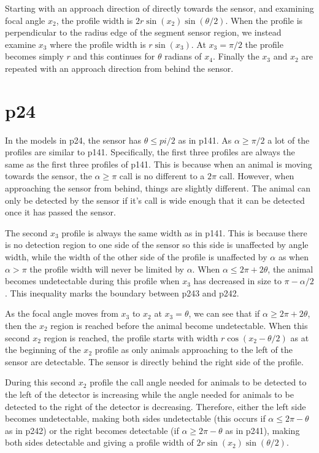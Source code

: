 Starting with an approach direction of directly towards the sensor, and examining focal angle $x_2$, the profile width is $2r\sin(x_2)\sin(\theta/2)$. When the profile is perpendicular to the radius edge of the segment sensor region, we instead examine $x_3$ where the profile width is $r\sin(x_3)$. At $x_3=\pi/2$ the profile becomes simply $r$ and this continues for $\theta $ radians of $x_4$. Finally the $x_3$ and $x_2$ are repeated with an approach direction from behind the sensor. 



\section{p24} \label{p24}

In the models in p24, the sensor has $\theta \le pi/2$ as in p141. As $\alpha \ge \pi/2$ a lot of the profiles are similar to p141. Specifically, the first three profiles are always the same as the first three profiles of p141. This is because when an animal is moving towards the sensor, the $\alpha \ge \pi$ call is no different to a $2\pi$ call. However, when approaching the sensor from behind, things are slightly different. The animal can only be detected by the sensor if it's call is wide enough that it can be detected once it has passed the sensor. 

The second $x_3$ profile is always the same width as in p141. This is because there is no detection region to one side of the sensor so this side is unaffected by angle width, while the width of the other side of the profile is unaffected by $\alpha$ as when $\alpha>\pi$ the profile width will never be limited by $\alpha$. When $\alpha \le 2\pi + 2\theta$, the animal becomes undetectable during this profile when  $x_3$ has decreased in size to $\pi - \alpha/2$. This inequality marks the boundary between p243 and p242. 

As the focal angle moves from $x_3$ to $x_2$  at $x_3=\theta$, we can see that if $\alpha \ge 2\pi + 2\theta$, then the $x_2$ region is reached before the animal become undetectable. When this second $x_2$ region is reached, the profile starts with width $r\cos(x_2 - \theta/2)$ as at the beginning of the $x_2$ profile as only animals approaching to the left of the sensor are detectable. The sensor is directly behind the right side of the profile.

During this second $x_2$ profile the call angle needed for animals to be detected to the left of the detector is increasing while the angle needed for animals to be detected to the right of the detector is decreasing. Therefore, either the left side becomes undetectable, making both sides undetectable (this occurs if $\alpha \le 2\pi - \theta$ as in p242) or the right becomes detectable (if $\alpha \ge 2\pi - \theta$ as in p241), making both sides detectable and giving a profile width of $2r\sin(x_2)\sin(\theta/2)$.


